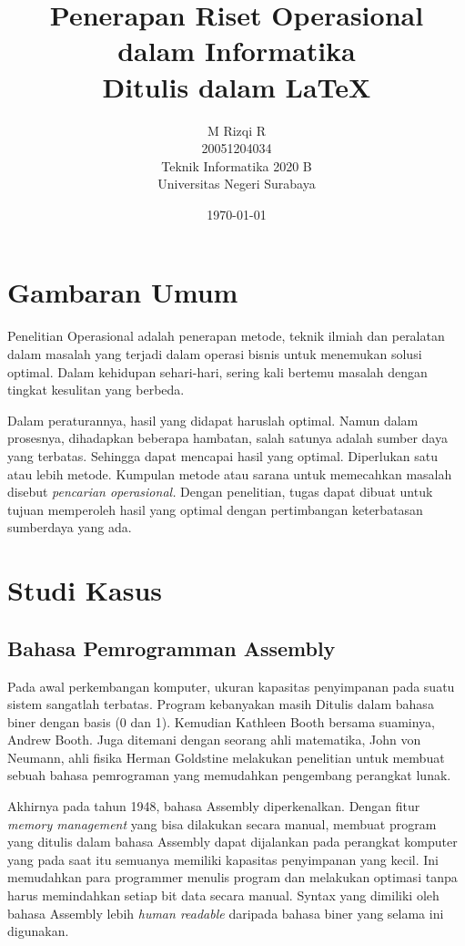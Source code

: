 \documentclass{article}
\title{\LARGE \textbf {\huge{Penerapan Riset Operasional dalam Informatika \\}}
    Ditulis dalam \LaTeX
}
\author{
    M Rizqi R\\
    20051204034\\
    Teknik Informatika 2020 B\\
    Universitas Negeri Surabaya\\
}
\date{\today}
\begin{document}
    \maketitle
    \section{Gambaran Umum}
    Penelitian Operasional adalah penerapan metode, teknik ilmiah
    dan peralatan dalam masalah yang terjadi dalam operasi bisnis
    untuk menemukan solusi optimal. Dalam kehidupan sehari-hari,
    sering kali bertemu masalah dengan tingkat kesulitan 
    yang berbeda.

    Dalam peraturannya, hasil yang didapat haruslah optimal.
    Namun dalam prosesnya, dihadapkan beberapa hambatan,
    salah satunya adalah sumber daya yang terbatas. Sehingga
    dapat mencapai hasil yang optimal. Diperlukan satu atau lebih
    metode. Kumpulan metode atau sarana untuk memecahkan masalah
    disebut \textit{pencarian operasional.} Dengan penelitian, 
    tugas dapat dibuat untuk tujuan memperoleh hasil yang optimal
    dengan pertimbangan keterbatasan sumberdaya yang ada.

    \section{Studi Kasus}
    \subsection{Bahasa Pemrogramman Assembly}
    Pada awal perkembangan komputer, ukuran kapasitas penyimpanan pada 
    suatu sistem sangatlah terbatas. Program kebanyakan masih Ditulis
    dalam bahasa biner dengan basis (0 dan 1). Kemudian Kathleen Booth 
    bersama suaminya, Andrew Booth. Juga ditemani dengan seorang ahli 
    matematika, John von Neumann, ahli fisika Herman Goldstine melakukan
    penelitian untuk membuat sebuah bahasa pemrograman yang memudahkan 
    pengembang perangkat lunak.

    Akhirnya pada tahun 1948, bahasa Assembly diperkenalkan. Dengan fitur 
    \textit{memory management} yang bisa dilakukan secara manual, membuat 
    program yang ditulis dalam bahasa Assembly dapat dijalankan pada perangkat
    komputer yang pada saat itu semuanya memiliki kapasitas penyimpanan yang
    kecil. Ini memudahkan para programmer menulis program dan melakukan optimasi
    tanpa harus memindahkan setiap bit data secara manual. Syntax yang dimiliki
    oleh bahasa Assembly lebih \textit{human readable} daripada bahasa biner
    yang selama ini digunakan.
\end{document}
